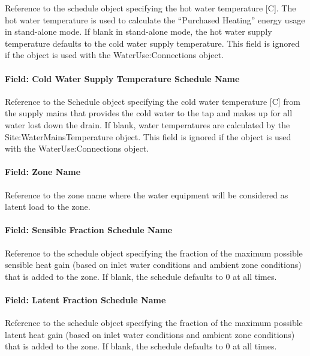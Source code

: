 Reference to the schedule object specifying the hot water temperature {[}C{]}. The hot water temperature is used to calculate the ``Purchased Heating'' energy usage in stand-alone mode. If blank in stand-alone mode, the hot water supply temperature defaults to the cold water supply temperature. This field is ignored if the object is used with the WaterUse:Connections object.

\paragraph{Field: Cold Water Supply Temperature Schedule Name}\label{field-cold-water-supply-temperature-schedule-name-000}

Reference to the Schedule object specifying the cold water temperature {[}C{]} from the supply mains that provides the cold water to the tap and makes up for all water lost down the drain. If blank, water temperatures are calculated by the Site:WaterMainsTemperature object. This field is ignored if the object is used with the WaterUse:Connections object.

\paragraph{Field: Zone Name}\label{field-zone-name-013}

Reference to the zone name where the water equipment will be considered as latent load to the zone.

\paragraph{Field: Sensible Fraction Schedule Name}\label{field-sensible-fraction-schedule-name}

Reference to the schedule object specifying the fraction of the maximum possible sensible heat gain (based on inlet water conditions and ambient zone conditions) that is added to the zone. If blank, the schedule defaults to 0 at all times.

\paragraph{Field: Latent Fraction Schedule Name}\label{field-latent-fraction-schedule-name}

Reference to the schedule object specifying the fraction of the maximum possible latent heat gain (based on inlet water conditions and ambient zone conditions) that is added to the zone. If blank, the schedule defaults to 0 at all times.

